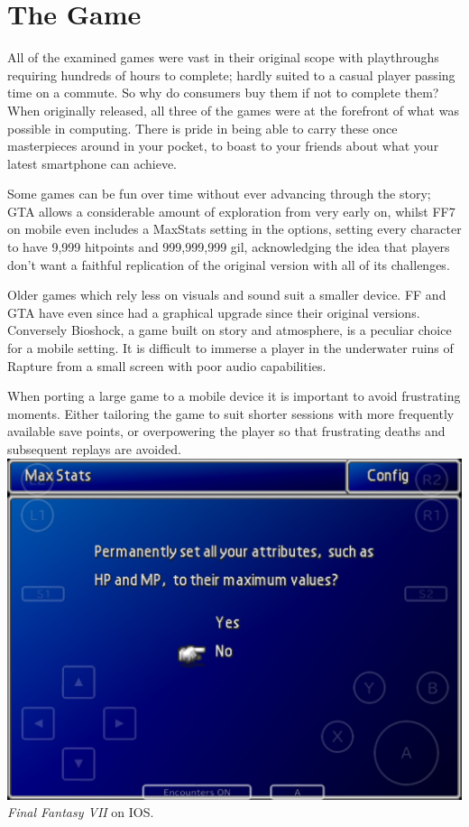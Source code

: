 \documentclass{scrartcl}
\begin{document}
{\section*{The Game}

All of the examined games were vast in their original scope with playthroughs requiring hundreds of hours to complete; hardly suited to a casual player passing time on a commute.  So why do consumers buy them if not to complete them?  When originally released, all three of the games were at the forefront of what was possible in computing.  There is pride in being able to carry these once masterpieces around in your pocket, to boast to your friends about what your latest smartphone can achieve.

Some games can be fun over time without ever advancing through the story; GTA allows a considerable amount of exploration from very early on, whilst FF7 on mobile even includes a MaxStats setting in the options, setting every character to have 9,999 hitpoints and 999,999,999 gil, acknowledging the idea that players don't want a faithful replication of the original version with all of its challenges.

Older games which rely less on visuals and sound suit a smaller device.  FF and GTA have even since had a graphical upgrade since their original versions.  Conversely Bioshock, a game built on story and atmosphere, is a peculiar choice for a mobile setting.  It is difficult to immerse a player in the underwater ruins of Rapture from a small screen with poor audio capabilities.

When porting a large game to a mobile device it is important to avoid frustrating moments.  Either tailoring the game to suit shorter sessions with more frequently available save points, or overpowering the player so that frustrating deaths and subsequent replays are avoided.\\

\includegraphics[scale = 0.18]{FF7_IOS_MaxStats}{
    \emph{Final Fantasy VII} on IOS.
}

}
\end{document}
